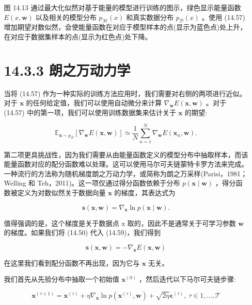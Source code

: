 \documentclass[10pt]{article}
\begin{document}
图 14.13 通过最大化似然对基于能量的模型进行训练的图示，绿色显示能量函数 \(E\left( {x,\mathbf{w}}\right)\) 以及相关的模型分布 \({p}_{\mathcal{M}}\left( x\right)\) 和真实数据分布 \({p}_{\mathcal{D}}\left( x\right)\) 。使用 (14.57) 增加期望对数似然，会使能量函数在对应于模型样本的点(显示为蓝色点)处上升，在对应于数据集样本的点(显示为红色点)处下降。

\section*{14.3.3 朗之万动力学}

当将 (14.57) 作为一种实际的训练方法应用时，我们需要对右侧的两项进行近似。对于 \(\mathbf{x}\) 的任何给定值，我们可以使用自动微分来计算 \({\nabla }_{\mathbf{w}}E\left( {\mathbf{x},\mathbf{w}}\right)\) 。对于 (14.57) 中的第一项，我们可以使用训练数据集来估计关于 \(\mathbf{x}\) 的期望:

\[
{\mathbb{E}}_{\mathbf{x} \sim  {p}_{\mathcal{D}}}\left\lbrack  {{\nabla }_{\mathbf{w}}E\left( {\mathbf{x},\mathbf{w}}\right) }\right\rbrack   \simeq  \frac{1}{N}\mathop{\sum }\limits_{{n = 1}}^{N}{\nabla }_{\mathbf{w}}E\left( {{\mathbf{x}}_{n},\mathbf{w}}\right) . \tag{14.58}
\]

第二项更具挑战性，因为我们需要从由能量函数定义的模型分布中抽取样本，而该能量函数对应的配分函数难以处理。这可以使用马尔可夫链蒙特卡罗方法来完成。一种流行的方法称为随机梯度朗之万动力学，或简称为朗之万采样(Parisi，1981；Welling 和 Teh，2011)。这一项仅通过得分函数依赖于分布 \(p\left( {\mathbf{x} \mid  \mathbf{w}}\right)\) ，得分函数被定义为对数似然关于数据向量 \(\mathbf{x}\) 的梯度，其表达式为

\[
\mathbf{s}\left( {\mathbf{x},\mathbf{w}}\right)  = {\nabla }_{\mathbf{x}}\ln p\left( {\mathbf{x} \mid  \mathbf{w}}\right) . \tag{14.59}
\]

值得强调的是，这个梯度是关于数据点 \(\mathrm{x}\) 取的，因此不是通常关于可学习参数 \(\mathbf{w}\) 的梯度。如果我们将 (14.50) 代入 (14.59)，我们得到

\[
\mathbf{s}\left( {\mathbf{x},\mathbf{w}}\right)  =  - {\nabla }_{\mathbf{x}}E\left( {\mathbf{x},\mathbf{w}}\right)  \tag{14.60}
\]

在这里我们看到配分函数不再出现，因为它与 \(\mathbf{x}\) 无关。

我们首先从先验分布中抽取一个初始值 \({\mathbf{x}}^{\left( 0\right) }\) ，然后迭代以下马尔可夫链步骤:

\[
{\mathbf{x}}^{\left( \tau  + 1\right) } = {\mathbf{x}}^{\left( \tau \right) } + \eta {\nabla }_{\mathbf{x}}\ln p\left( {{\mathbf{x}}^{\left( \tau \right) },\mathbf{w}}\right)  + \sqrt{2\eta }{\mathbf{\epsilon }}^{\left( \tau \right) },\;\tau  \in  1,\ldots ,\mathcal{T} \tag{14.61}
\]
\end{document}
